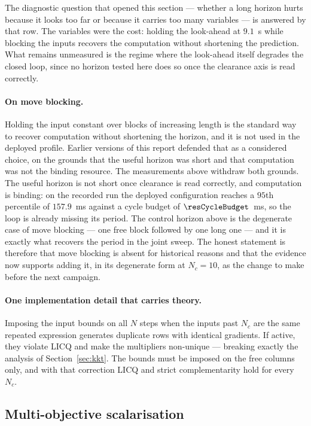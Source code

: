 \documentclass[11pt,a4paper]{article}
\newcommand{\Ninput}{N_c}
\begin{document}
The diagnostic question that opened this section --- whether a long horizon hurts because it looks too far or
because it carries too many variables --- is answered by that row. The variables were the cost: holding the
look-ahead at $9.1$~s while blocking the inputs recovers the computation without shortening the prediction.
What remains unmeasured is the regime where the look-ahead itself degrades the closed loop, since no horizon
tested here does so once the clearance axis is read correctly.

\paragraph{On move blocking.} Holding the input constant over blocks of increasing length is the standard way
to recover computation without shortening the horizon, and it is not used in the deployed profile. Earlier
versions of this report defended that as a considered choice, on the grounds that the useful horizon was
short and that computation was not the binding resource. The measurements above withdraw both grounds. The
useful horizon is not short once clearance is read correctly, and computation is binding: on the recorded run
the deployed configuration reaches a $95$th percentile of $157.9$~ms against a cycle budget of
$\resCycleBudget$~ms, so the loop is already missing its period. The control horizon above is the degenerate
case of move blocking --- one free block followed by one long one --- and it is exactly what recovers the
period in the joint sweep. The honest statement is therefore that move blocking is absent for historical
reasons and that the evidence now supports adding it, in its degenerate form at $\Ninput=10$, as the change
to make before the next campaign.

\paragraph{One implementation detail that carries theory.} Imposing the input bounds on all $N$ steps when
the inputs past $\Ninput$ are the same repeated expression generates duplicate rows with identical gradients.
If active, they violate LICQ and make the multipliers non-unique --- breaking exactly the analysis of
Section~\ref{sec:kkt}. The bounds must be imposed on the free columns only, and with that correction LICQ and
strict complementarity hold for every $\Ninput$.

\subsection{Multi-objective scalarisation}
\label{sec:pareto}
\end{document}
